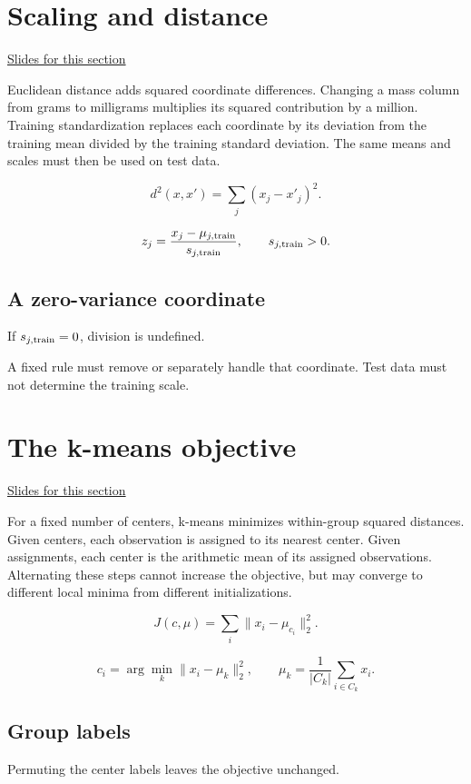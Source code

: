 \documentclass[11pt,letterpaper]{article}
\theoremstyle{definition}\newtheorem{definition}{Definition}\newtheorem{example}{Example}
\numberwithin{equation}{section}
\begin{document}
\section{Scaling and distance}
\hypertarget{note-scaling-and-distance}{}\label{note:scaling-and-distance}
{\small \href{slides.html\#frame=scaling-and-distance\&step=1}{Slides for this section}}\par
Euclidean distance adds squared coordinate differences. Changing a mass column from grams to milligrams multiplies its squared contribution by a million. Training standardization replaces each coordinate by its deviation from the training mean divided by the training standard deviation. The same means and scales must then be used on test data.

\[
d^2(x,x')=\sum_j(x_j-x'_j)^2.
\]

\[
z_j=\frac{x_j-\mu_{j,\rm train}}{s_{j,\rm train}},\qquad s_{j,\rm train}>0.
\]

\subsection*{A zero-variance coordinate}
If $s_{j,\rm train}=0$, division is undefined.

A fixed rule must remove or separately handle that coordinate. Test data must not determine the training scale.
\section{The k-means objective}
\hypertarget{note-the-k-means-objective}{}\label{note:the-k-means-objective}
{\small \href{slides.html\#frame=the-k-means-objective\&step=1}{Slides for this section}}\par
For a fixed number of centers, k-means minimizes within-group squared distances. Given centers, each observation is assigned to its nearest center. Given assignments, each center is the arithmetic mean of its assigned observations. Alternating these steps cannot increase the objective, but may converge to different local minima from different initializations.

\[
J(c,\mu)=\sum_i\|x_i-\mu_{c_i}\|_2^2.
\]

\[
c_i=\arg\min_k\|x_i-\mu_k\|_2^2,\qquad
\mu_k=\frac1{|C_k|}\sum_{i\in C_k}x_i.
\]

\subsection*{Group labels}
Permuting the center labels leaves the objective unchanged.
\end{document}

